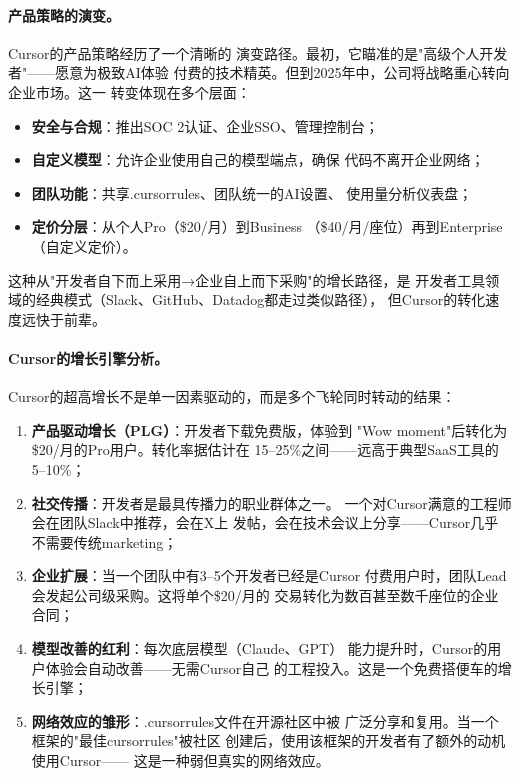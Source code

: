 \paragraph{产品策略的演变。}Cursor的产品策略经历了一个清晰的
演变路径。最初，它瞄准的是"高级个人开发者"——愿意为极致AI体验
付费的技术精英。但到2025年中，公司将战略重心转向企业市场。这一
转变体现在多个层面：

\begin{itemize}
  \item \textbf{安全与合规}：推出SOC 2认证、企业SSO、管理控制台；
  \item \textbf{自定义模型}：允许企业使用自己的模型端点，确保
    代码不离开企业网络；
  \item \textbf{团队功能}：共享.cursorrules、团队统一的AI设置、
    使用量分析仪表盘；
  \item \textbf{定价分层}：从个人Pro（\$20/月）到Business
    （\$40/月/座位）再到Enterprise（自定义定价）。
\end{itemize}

这种从"开发者自下而上采用→企业自上而下采购"的增长路径，是
开发者工具领域的经典模式（Slack、GitHub、Datadog都走过类似路径），
但Cursor的转化速度远快于前辈。

\paragraph{Cursor的增长引擎分析。}
Cursor的超高增长不是单一因素驱动的，而是多个飞轮同时转动的结果：

\begin{enumerate}
  \item \textbf{产品驱动增长（PLG）}：开发者下载免费版，体验到
    "Wow moment"后转化为\$20/月的Pro用户。转化率据估计在
    15--25\%之间——远高于典型SaaS工具的5--10\%；
  \item \textbf{社交传播}：开发者是最具传播力的职业群体之一。
    一个对Cursor满意的工程师会在团队Slack中推荐，会在X上
    发帖，会在技术会议上分享——Cursor几乎不需要传统marketing；
  \item \textbf{企业扩展}：当一个团队中有3--5个开发者已经是Cursor
    付费用户时，团队Lead会发起公司级采购。这将单个\$20/月的
    交易转化为数百甚至数千座位的企业合同；
  \item \textbf{模型改善的红利}：每次底层模型（Claude、GPT）
    能力提升时，Cursor的用户体验会自动改善——无需Cursor自己
    的工程投入。这是一个免费搭便车的增长引擎；
  \item \textbf{网络效应的雏形}：.cursorrules文件在开源社区中被
    广泛分享和复用。当一个框架的"最佳cursorrules"被社区
    创建后，使用该框架的开发者有了额外的动机使用Cursor——
    这是一种弱但真实的网络效应。
\end{enumerate}

